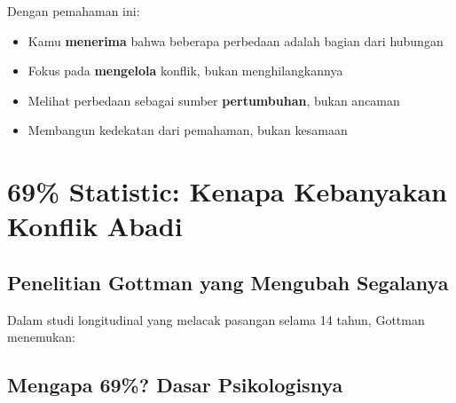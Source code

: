 Dengan pemahaman ini:
\begin{itemize}
    \item Kamu \textbf{menerima} bahwa beberapa perbedaan adalah bagian dari hubungan
    \item Fokus pada \textbf{mengelola} konflik, bukan menghilangkannya
    \item Melihat perbedaan sebagai sumber \textbf{pertumbuhan}, bukan ancaman
    \item Membangun kedekatan dari pemahaman, bukan kesamaan
\end{itemize}

\section{69\% Statistic: Kenapa Kebanyakan Konflik Abadi}

\subsection{Penelitian Gottman yang Mengubah Segalanya}

Dalam studi longitudinal yang melacak pasangan selama 14 tahun, Gottman menemukan:

\begin{center}
\end{center}

\subsection{Mengapa 69\%? Dasar Psikologisnya}

